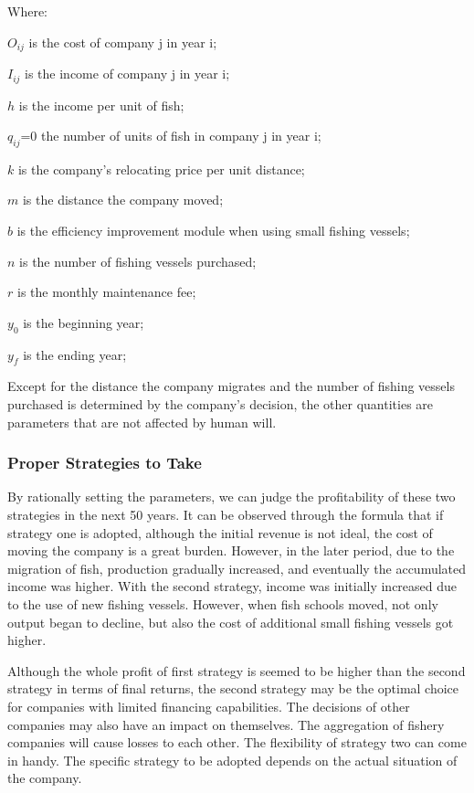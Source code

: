 \documentclass{mcmthesis}
\numberwithin{figure}{section}
\numberwithin{table}{section}
\begin{document}
Where:

$O_{ij}$ is the cost of company j in year i;

$I_{ij}$ is the income of company j in year i;

$h$ is the income per unit of fish;

$q_{ij}$=0 the number of units of fish in company j in year i;

$k$ is the company's relocating price per unit distance;

$m$ is the distance the company moved;

$b$ is the efficiency improvement module when using small fishing vessels;

$n$ is the number of fishing vessels purchased;

$r$ is the monthly maintenance fee;

$y_0$ is the beginning year;

$y_f$ is the ending year;

Except for the distance the company migrates and the number of fishing vessels purchased is determined by the company's decision, the other quantities are parameters that are not affected by human will.

\subsubsection{Proper Strategies to Take}
By rationally setting the parameters, we can judge the profitability of these two strategies in the next 50 years. It can be observed through the formula that if strategy one is adopted, although the initial revenue is not ideal, the cost of moving the company is a great burden. However, in the later period, due to the migration of fish, production gradually increased, and eventually the accumulated income was higher. With the second strategy, income was initially increased due to the use of new fishing vessels. However, when fish schools moved, not only output began to decline, but also the cost of additional small fishing vessels got higher.

Although the whole profit of first strategy is seemed to be higher than the second strategy in terms of final returns, the second strategy may be the optimal choice for companies with limited financing capabilities. The decisions of other companies may also have an impact on themselves. The aggregation of fishery companies will cause losses to each other. The flexibility of strategy two can come in handy. The specific strategy to be adopted depends on the actual situation of the company.
\end{document}
